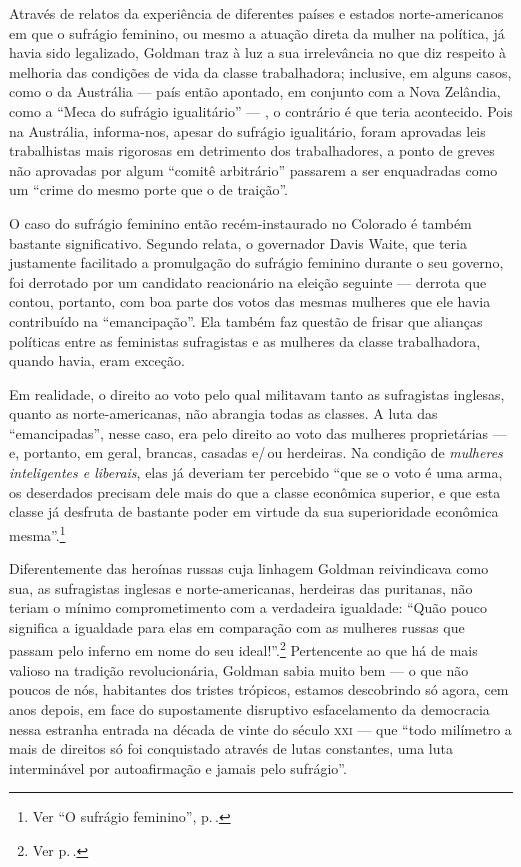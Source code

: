 Através de relatos da experiência de diferentes países e estados
norte-americanos em que o sufrágio feminino, ou mesmo a atuação direta
da mulher na política, já havia sido legalizado, Goldman traz à luz a
sua irrelevância no que diz respeito à melhoria das condições de vida da
classe trabalhadora; inclusive, em alguns casos, como o da Austrália ---
país então apontado, em conjunto com a Nova Zelândia, como a ``Meca do
sufrágio igualitário'' --- , o contrário é que teria acontecido. Pois na
Austrália, informa-nos, apesar do sufrágio igualitário, foram
aprovadas leis trabalhistas mais rigorosas em detrimento dos
trabalhadores, a ponto de greves não aprovadas por algum ``comitê
arbitrário'' passarem a ser enquadradas como um ``crime do mesmo porte
que o de traição''.


O caso do sufrágio feminino então recém-instaurado
no Colorado é também bastante significativo. Segundo relata, o
governador Davis Waite, que teria justamente facilitado a promulgação do
sufrágio feminino durante o seu governo, foi derrotado por um candidato
reacionário na eleição seguinte --- derrota que contou, portanto, com boa
parte dos votos das mesmas mulheres que ele havia contribuído na
``emancipação''. Ela também faz questão de frisar que alianças políticas
entre as feministas sufragistas e as mulheres da classe trabalhadora,
quando havia, eram exceção.

Em realidade, o direito ao voto pelo qual
militavam tanto as sufragistas inglesas, quanto as
norte-americanas, não abrangia todas as classes. A luta das
``emancipadas'', nesse caso, era pelo direito ao voto das mulheres
proprietárias --- e, portanto, em geral, brancas, casadas e/\,ou herdeiras.
Na condição de \textit{mulheres inteligentes e liberais}, elas já deveriam ter percebido ``que se o voto
é uma arma, os deserdados precisam dele mais do que a classe econômica
superior, e que esta classe já desfruta de bastante poder em virtude da
sua superioridade econômica mesma''.\footnote{Ver ``O sufrágio feminino'', p.\,\pageref{virtude}.}

Diferentemente das heroínas russas
cuja linhagem Goldman reivindicava como sua, as sufragistas inglesas e
norte-americanas, herdeiras das puritanas, não teriam o mínimo
comprometimento com a verdadeira igualdade: ``Quão pouco significa a
igualdade para elas em comparação com as mulheres russas que passam pelo
inferno em nome do seu ideal!''.\footnote{Ver p.\,\pageref{russas}.} Pertencente ao que há de mais valioso na
tradição revolucionária, Goldman sabia muito bem --- o que não poucos de
nós, habitantes dos tristes trópicos, estamos descobrindo só agora, cem
anos depois, em face do supostamente disruptivo esfacelamento da
democracia nessa estranha entrada na década de vinte do século
\textsc{xxi} --- que ``todo milímetro a mais de direitos só foi conquistado através
de lutas constantes, uma luta interminável por autoafirmação e jamais
pelo sufrágio''.

